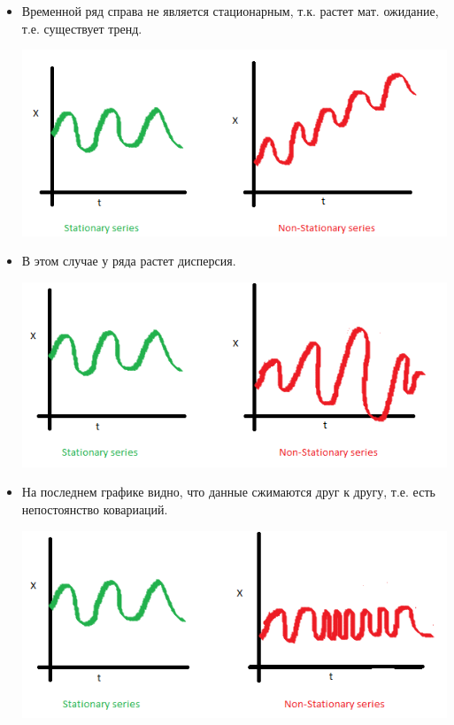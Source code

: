\documentclass[a4paper]{article}
\begin{document}
	\begin{itemize}
		\item Временной ряд справа не является стационарным, т.к. растет мат. ожидание, т.е. существует тренд.
		\begin{center}
			\includegraphics[scale=0.45]{./img1_1.png}
		\end{center}
		\item В этом случае у ряда растет дисперсия.
		\begin{center}
			\includegraphics[scale=0.5]{./img1_2.png}
		\end{center}
		\item На последнем графике видно, что данные сжимаются друг к другу, т.е. есть непостоянство ковариаций.
		\begin{center}
			\includegraphics[scale=0.5]{./img1_3.png}
		\end{center}
	\end{itemize}
	
\end{document}
